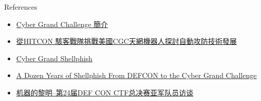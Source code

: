 \documentclass{beamer}
\begin{document}
\begin{frame}
  \begin{block}{References}
    \begin{itemize}
      \item \href{http://kb.hitcon.org/post/131158681227/cyber-grand-challenge-\%E7\%B0\%A1\%E4\%BB\%8B}{Cyber Grand Challenge 簡介}
      \item \href{http://www.slideshare.net/seiyalee/hitcon-cgcautonomous-hacking-and-patching/1}{從HITCON 駭客戰隊挑戰美國CGC天網機器人探討自動攻防技術發展}
      \item \href{https://media.defcon.org/DEF\%20CON\%2024/DEF\%20CON\%2024\%20presentations/DEFCON-24-Shellphish-Cyber\%20Grand\%20Shellphish-UPDATED.pdf}{Cyber Grand Shellphish}
      \item \href{http://cs.ucsb.edu/~antoniob/files/hitcon\_2015\_public.pdf}{A Dozen Years of Shellphish From DEFCON to the Cyber Grand Challenge}
      \item \href{https://zhuanlan.zhihu.com/p/22005633}{机器的黎明--第24届DEF CON CTF总决赛亚军队员访谈}
    \end{itemize}
  \end{block}
\end{frame}
\end{document}
